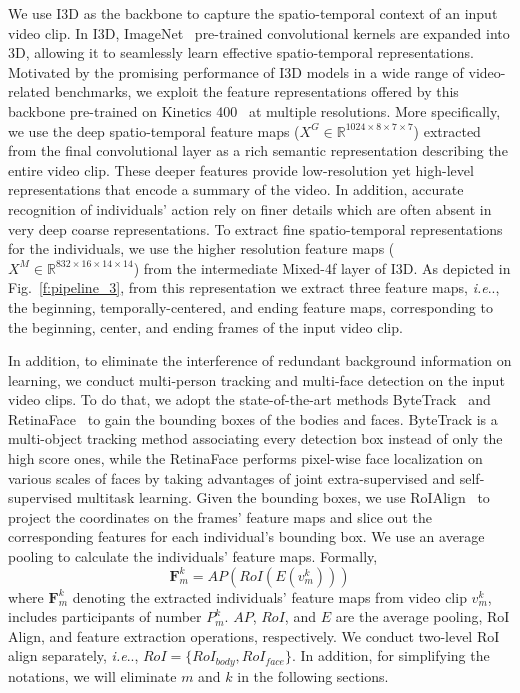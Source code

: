 \documentclass[10pt,journal,compsoc]{IEEEtran}
\makeatletter
\DeclareRobustCommand\onedot{\futurelet\@let@token\@onedot}
\def\@onedot{\ifx\@let@token.\else.\null\fi\xspace}
\def\ie{\emph{i.e}\onedot} \def\Ie{\emph{I.e}\onedot}
\makeatother
\begin{document}
We use I3D as the backbone to capture the spatio-temporal context of an input video clip. In I3D, ImageNet~\cite{Deng2009ImageNet} pre-trained convolutional kernels are expanded into 3D, allowing it to seamlessly learn effective spatio-temporal representations. Motivated by the promising performance of I3D models in a wide range of video-related benchmarks, we exploit the feature representations offered by this backbone pre-trained on Kinetics 400~\cite{Kay2017Kinetics} at multiple resolutions. More specifically, we use the deep spatio-temporal feature maps ($X^G \in \mathbb{R}^{1024\times8\times7\times7}$) extracted from the final convolutional layer as a rich semantic representation describing the entire video clip. These deeper features provide low-resolution yet high-level representations that encode a summary of the video. In addition, accurate recognition of individuals' action rely on finer details which are often absent in very deep coarse representations. To extract fine spatio-temporal representations for the individuals, we use the higher resolution feature maps ($X^M \in \mathbb{R}^{832\times16\times14\times14}$) from the intermediate Mixed-4f layer of I3D. As depicted in Fig.~\ref{f:pipeline_3}, from this representation we extract three feature maps, \ie, the beginning, temporally-centered, and ending feature maps, corresponding to the beginning, center, and ending frames of the input video clip.

In addition, to eliminate the interference of redundant background information on learning, we conduct multi-person tracking and multi-face detection on the input video clips. To do that, we adopt the state-of-the-art methods ByteTrack~\cite{Zhang2021ByteTrack} and RetinaFace~\cite{Deng2020RetinaFace} to gain the bounding boxes of the bodies and faces. ByteTrack is a multi-object tracking method associating every detection box instead of only the high score ones, while the RetinaFace performs pixel-wise face localization on various scales of faces by taking advantages of joint extra-supervised and self-supervised multitask learning. Given the bounding boxes, we use RoIAlign~\cite{He2017Mask} to project the coordinates on the frames' feature maps and slice out the corresponding features for each individual's bounding box. We use an average pooling to calculate the individuals' feature maps. Formally,
\begin{equation}
  {\mathbf{F}}_m^k = AP\left(RoI\left(E\left(v_m^k\right)\right)\right)
\end{equation}
where ${\mathbf{F}}_m^k$ denoting the extracted individuals' feature maps from video clip $v_m^k$, includes participants of number $P_m^k$. $AP$, $RoI$, and $E$ are the average pooling, RoI Align, and feature extraction operations, respectively. We conduct two-level RoI align separately, \ie, $RoI = \{RoI_{body}, RoI_{face}\}$. In addition, for simplifying the notations, we will eliminate $m$ and $k$ in the following sections.
\end{document}
